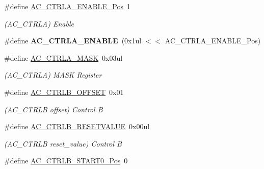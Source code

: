 \begin{DoxyCompactItemize}
\item 
\hypertarget{group___s_a_m_l21___a_c_ga6ca649f4703d6b341f61a8f9d7a679b9}{}\#define \hyperlink{group___s_a_m_l21___a_c_ga6ca649f4703d6b341f61a8f9d7a679b9}{A\+C\+\_\+\+C\+T\+R\+L\+A\+\_\+\+E\+N\+A\+B\+L\+E\+\_\+\+Pos}~1\label{group___s_a_m_l21___a_c_ga6ca649f4703d6b341f61a8f9d7a679b9}

\begin{DoxyCompactList}\small\item\em (A\+C\+\_\+\+C\+T\+R\+L\+A) Enable \end{DoxyCompactList}\item 
\hypertarget{group___s_a_m_l21___a_c_gaa9eb0e8fa6387220d3b0a3840139c29a}{}\#define {\bfseries A\+C\+\_\+\+C\+T\+R\+L\+A\+\_\+\+E\+N\+A\+B\+L\+E}~(0x1ul $<$$<$ A\+C\+\_\+\+C\+T\+R\+L\+A\+\_\+\+E\+N\+A\+B\+L\+E\+\_\+\+Pos)\label{group___s_a_m_l21___a_c_gaa9eb0e8fa6387220d3b0a3840139c29a}

\item 
\hypertarget{group___s_a_m_l21___a_c_ga9825c7ce5b1a6de685e38859c9cd282d}{}\#define \hyperlink{group___s_a_m_l21___a_c_ga9825c7ce5b1a6de685e38859c9cd282d}{A\+C\+\_\+\+C\+T\+R\+L\+A\+\_\+\+M\+A\+S\+K}~0x03ul\label{group___s_a_m_l21___a_c_ga9825c7ce5b1a6de685e38859c9cd282d}

\begin{DoxyCompactList}\small\item\em (A\+C\+\_\+\+C\+T\+R\+L\+A) M\+A\+S\+K Register \end{DoxyCompactList}\item 
\hypertarget{group___s_a_m_l21___a_c_ga63f35a95c3a9ef7fa1664630f3831991}{}\#define \hyperlink{group___s_a_m_l21___a_c_ga63f35a95c3a9ef7fa1664630f3831991}{A\+C\+\_\+\+C\+T\+R\+L\+B\+\_\+\+O\+F\+F\+S\+E\+T}~0x01\label{group___s_a_m_l21___a_c_ga63f35a95c3a9ef7fa1664630f3831991}

\begin{DoxyCompactList}\small\item\em (A\+C\+\_\+\+C\+T\+R\+L\+B offset) Control B \end{DoxyCompactList}\item 
\hypertarget{group___s_a_m_l21___a_c_ga50ffeb7cd3de2b4dda6da39ff8cae69e}{}\#define \hyperlink{group___s_a_m_l21___a_c_ga50ffeb7cd3de2b4dda6da39ff8cae69e}{A\+C\+\_\+\+C\+T\+R\+L\+B\+\_\+\+R\+E\+S\+E\+T\+V\+A\+L\+U\+E}~0x00ul\label{group___s_a_m_l21___a_c_ga50ffeb7cd3de2b4dda6da39ff8cae69e}

\begin{DoxyCompactList}\small\item\em (A\+C\+\_\+\+C\+T\+R\+L\+B reset\+\_\+value) Control B \end{DoxyCompactList}\item 
\hypertarget{group___s_a_m_l21___a_c_ga9fe01e62bcc1df5dd7eebbdae8e28ebb}{}\#define \hyperlink{group___s_a_m_l21___a_c_ga9fe01e62bcc1df5dd7eebbdae8e28ebb}{A\+C\+\_\+\+C\+T\+R\+L\+B\+\_\+\+S\+T\+A\+R\+T0\+\_\+\+Pos}~0\label{group___s_a_m_l21___a_c_ga9fe01e62bcc1df5dd7eebbdae8e28ebb}


\end{DoxyCompactItemize}
